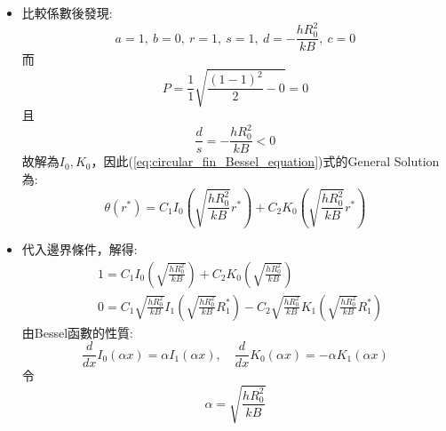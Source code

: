 \documentclass[../main.tex]{subfiles}
\begin{document}
\begin{itemize}
\begin{itemize}
\begin{equation}
        x^2 \frac{d^2y}{dx^2}+x(a+2bx^r)\frac{dy}{dx} + \left[
          c+dx^{2s}-b(1-a-r)x^r + b^2 x^{2r}
        \right]y = 0
      \end{equation}
      其解為:
      \begin{equation}
        y(x)=x^{\frac{1-a}{2}} e^{- \frac{b x^r}{r}} Z_p\left(
          \frac{\sqrt{d}}{s}x^s\right),\quad P = \frac{1}{s}\sqrt{\frac{(1-a)^2}{2} -c}
      \end{equation}
      如果$\frac{d}{s}$是實數，則解為$J_P,Y_P$\\
      如果$\frac{d}{s}$是虛數，則解為$I_P,K_P$
      \item 比較係數後發現:
      \begin{equation}
        a=1,~b=0,~r=1,~s=1,~d=-\frac{h R_0^2}{kB},~c=0
      \end{equation}
      而
      \begin{equation}
        P = \frac{1}{1}\sqrt{\frac{(1-1)^2}{2}-0} = 0
      \end{equation}
      且
      \begin{equation}
        \frac{d}{s} = -\frac{h R_0^2}{kB} < 0
      \end{equation}
      故解為$I_0,K_0$，因此(\ref{eq:circular_fin_Bessel_equation})式的General Solution為:
      \begin{equation}
        \theta(r^\ast) = C_1 I_0\left(\sqrt{\frac{h R_0^2}{kB}} r^\ast\right)
        + C_2 K_0\left(\sqrt{\frac{h R_0^2}{kB}} r^\ast\right)
      \end{equation}
      \item 代入邊界條件，解得:
      \begin{align}
        & 1 = C_1 I_0\left(\sqrt{\frac{h R_0^2}{kB}}\right)
        + C_2 K_0\left(\sqrt{\frac{h R_0^2}{kB}}\right) \label{eq:circular_fin_Bessel_BC1}\\
        & 0 = C_1 \sqrt{\frac{h R_0^2}{kB}} I_1\left(\sqrt{\frac{h R_0^2}{kB}} R_1^\ast\right)
        - C_2 \sqrt{\frac{h R_0^2}{kB}} K_1\left(\sqrt{\frac{h R_0^2}{kB}} R_1^\ast\right) \label{eq:circular_fin_Bessel_BC2}
      \end{align}
      由Bessel函數的性質:
      \begin{equation}
        \frac{d}{dx}I_0(\alpha x) = \alpha I_1(\alpha x),\quad
        \frac{d}{dx}K_0(\alpha x) = -\alpha K_1(\alpha x)
      \end{equation}
      令
      \begin{equation}
        \alpha = \sqrt{\frac{h R_0^2}{kB}}
      \end{equation}

\end{itemize}
\end{itemize}
\end{document}
